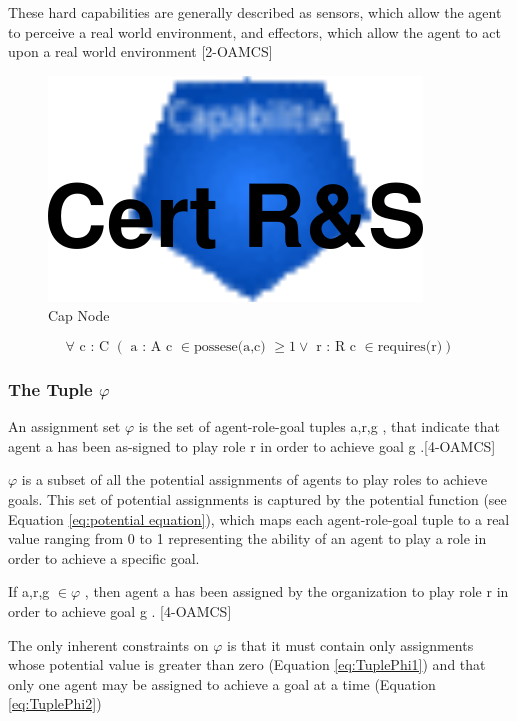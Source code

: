 These hard capabilities are generally described as sensors, which allow the agent to perceive a real world
environment, and effectors, which allow the agent to act upon a real world environment  [2-OAMCS]

\begin{figure}[th]
	\centering
		\includegraphics{chapiter1/img/Cap}
	\caption{\label{fig:Cap Node}Cap Node }
\end{figure}


\begin{equation}
\forall\textrm{ c : C }\left(\textrm{ a : A c }\in\textrm{possese(a,c) }\geq1\lor\textrm{ r : R c }\in\textrm{requires(r)}\right)\label{eq : capabilities}
\end{equation}


\subsubsection{ The Tuple  $\varphi$ } 
An assignment set $\varphi$ is the set of agent-role-goal tuples  \textlangle{} a,r,g \textrangle{} , that indicate that agent a has been as-signed to play role r in order to achieve goal g .[4-OAMCS]

$\varphi$ is a subset of all the potential assignments of agents to play roles to achieve goals. This set of potential assignments is captured by the potential function (see Equation \ref{eq:potential equation}), which maps each agent-role-goal tuple to a real value ranging from 0 to 1 representing the ability of an agent to play a role in order to achieve a specific goal.
	  
If \textlangle a,r,g \textrangle $\in \varphi$ , then agent a has been assigned by the organization to play role r in order to achieve goal g . [4-OAMCS]

The only inherent constraints on $\varphi$ is that it must contain only assignments whose potential value is greater than zero (Equation \ref{eq:TuplePhi1}) and that only one agent may be assigned to achieve a goal at a time (Equation \ref{eq:TuplePhi2})		


